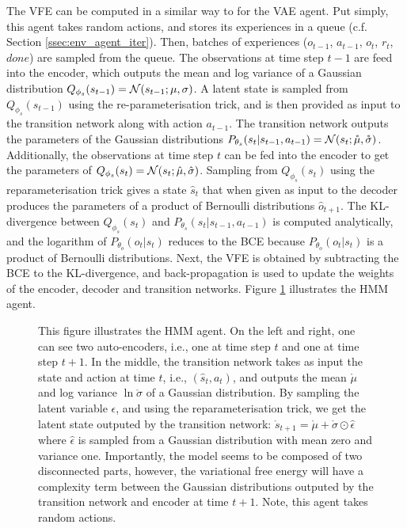 \documentclass[twoside,11pt]{article}
\let\oldmathcal\mathcal
\renewcommand{\mathcal}[1]{%
  \IfSubStr{ABCDEFGHIJKLMNOPQRSTUVWXYZ}{#1}{\oldmathcal{#1}}{\mathdutchcal{#1}}
}
\begin{document}
The VFE can be computed in a similar way to for the VAE agent. Put simply, this agent takes random actions, and stores its experiences in a queue (c.f. Section \ref{ssec:env_agent_iter}). Then, batches of experiences ($o_{t-1}$, $a_{t-1}$, $o_t$, $r_t$, $done$) are sampled from the queue. The observations at time step $t - 1$ are feed into the encoder, which outputs the mean and log variance of a Gaussian distribution $Q_{\phi_s}(s_{t-1}) = \mathcal{N}(s_{t-1};\mu, \sigma)$. A latent state is sampled from $Q_{\phi_s}(s_{t-1})$ using the re-parameterisation trick, and is then provided as input to the transition network along with action $a_{t-1}$. The transition network outputs the parameters of the Gaussian distributions $P_{\theta_s}(s_t|s_{t-1},a_{t-1}) = \mathcal{N}(s_t;\mathring{\mu}, \mathring{\sigma})$. Additionally, the observations at time step $t$ can be fed into the encoder to get the parameters of $Q_{\phi_s}(s_t) = \mathcal{N}(s_t;\hat{\mu}, \hat{\sigma})$. Sampling from $Q_{\phi_s}(s_t)$ using the reparameterisation trick gives a state $\hat{s}_t$ that when given as input to the decoder produces the parameters of a product of Bernoulli distributions $\hat{o}_{t+1}$. The KL-divergence between $Q_{\phi_s}(s_t)$ and $P_{\theta_s}(s_t|s_{t-1},a_{t-1})$ is computed analytically, and the logarithm of $P_{\theta_o}(o_t|s_t)$ reduces to the BCE because $P_{\theta_o}(o_t|s_t)$ is a product of Bernoulli distributions. Next, the VFE is obtained by subtracting the BCE to the KL-divergence, and back-propagation is used to update the weights of the encoder, decoder and transition networks. Figure \ref{fig:HMM} illustrates the HMM agent. 

\begin{figure}[h]
	\begin{center}
	\end{center}
	\caption{This figure illustrates the HMM agent. On the left and right, one can see two auto-encoders, i.e., one at time step $t$ and one at time step $t+1$. In the middle, the transition network takes as input the state and action at time $t$, i.e., $(\hat{s}_t, a_t)$, and outputs the mean $\mathring{\mu}$ and log variance $\ln\mathring{\sigma}$ of a Gaussian distribution. By sampling the latent variable $\epsilon$, and using the reparameterisation trick, we get the latent state outputed by the transition network: $\mathring{s}_{t+1} = \mathring{\mu} + \mathring{\sigma} \odot \hat{\epsilon}$ where $\hat{\epsilon}$ is sampled from a Gaussian distribution with mean zero and variance one. Importantly, the model seems to be composed of two disconnected parts, however, the variational free energy will have a complexity term between the Gaussian distributions outputed by the transition network and encoder at time $t+1$. Note, this agent takes random actions.}
   \label{fig:HMM}
\end{figure}
\end{document}

